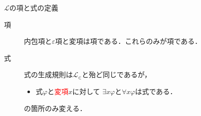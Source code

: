 	
	\begin{itembox}[l]{$\mathcal{L}$の項と式の定義}
		\begin{description}
			\item[項] 内包項と$\varepsilon$項と変項は項である．これらのみが項である．
			\item[式] 式の生成規則は$\mathcal{L}_{\in}$と殆ど同じであるが，
				\begin{itemize}
					\item 式$\varphi$と\textcolor{red}{変項}$x$に対して
						$\exists x \varphi$と$\forall x \varphi$は式である．
				\end{itemize}
				の箇所のみ変える．
		\end{description}
	\end{itembox}